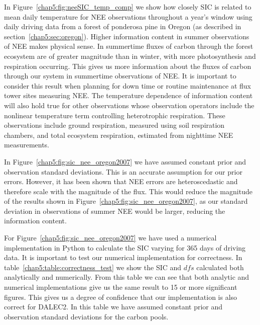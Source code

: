 In Figure~\ref{chap5:fig:neeSIC_temp_comp} we show how closely SIC is related to mean daily temperature for NEE observations throughout a year's window using daily driving data from a forest of ponderosa pine in Oregon (as described in section~\ref{chap5:sec:oregon}). Higher information content in summer observations of NEE makes physical sense. In summertime fluxes of carbon through the forest ecosystem are of greater magnitude than in winter, with more photosynthesis and respiration occurring. This gives us more information about the fluxes of carbon through our system in summertime observations of NEE. It is important to consider this result when planning for down time or routine maintenance at flux tower sites measuring NEE. The temperature dependence of information content will also hold true for other observations whose observation operators include the nonlinear temperature term controlling heterotrophic respiration. These observations include ground respiration, measured using soil respiration chambers, and total ecosystem respiration, estimated from nighttime NEE measurements.

In Figure~\ref{chap5:fig:sic_nee_oregon2007} we have assumed constant prior and observation standard deviations. This is an accurate assumption for our prior errors. However, it has been shown that NEE errors are heteroscedastic \citep{Richardson200838} and therefore scale with the magnitude of the flux. This would reduce the magnitude of the results shown in Figure~\ref{chap5:fig:sic_nee_oregon2007}, as our standard deviation in observations of summer NEE would be larger, reducing the information content.

For Figure~\ref{chap5:fig:sic_nee_oregon2007} we have used a numerical implementation in Python to calculate the SIC varying for 365 days of driving data. It is important to test our numerical implementation for correctness. In table~\ref{chap5:table:correctness_test} we show the SIC and \(dfs\) calculated both analytically and numerically. From this table we can see that both analytic and numerical implementations give us the same result to 15 or more significant figures. This gives us a degree of confidence that our implementation is also correct for DALEC2. In this table we have assumed constant prior and observation standard deviations for the carbon pools.

